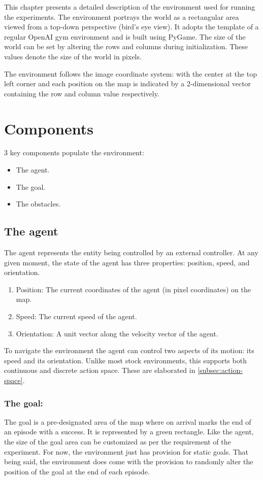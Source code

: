\label{ch:enviornment}
This chapter presents a detailed description of the environment used for running the experiments. The environment portrays the world as a rectangular area viewed from a top-down perspective (bird's eye view). It adopts the template of a regular OpenAI gym environment and is built using PyGame.
The size of the world can be set by altering the rows and columns during initialization. These values denote the size of the world in pixels.

The environment follows the image coordinate system: with the center at the top left corner and each position on the map is indicated by a 2-dimensional vector containing the row and column value respectively.\\
\section{Components}
3 key components populate the environment: 
\begin{itemize}
    \item The agent.
    \item The goal.
    \item The obstacles.
\end{itemize}
\subsection{The agent}
The agent represents the entity being controlled by an external controller. At any given moment, the state of the agent has three properties: position, speed, and orientation.
\begin{enumerate}
    \item Position: The current coordinates of the agent (in pixel coordinates) on the map.
    \item Speed: The current speed of the agent.
    \item Orientation: A unit vector along the velocity vector of the agent.
\end{enumerate}
To navigate the environment the agent can control two aspects of its motion: its speed and its orientation.
Unlike most stock environments, this supports both continuous and discrete action space. These are elaborated in \autoref{subsec:action-space}.
\subsubsection{The goal:}
The goal is a pre-designated area of the map where on arrival marks the end of an episode with a success. It is represented by a green rectangle. Like the agent, the size of the goal area can be customized as per the requirement of the experiment. For now, the environment just has provision for static goals. That being said, the environment does come with the provision to randomly alter the position of the goal at the end of each episode.


